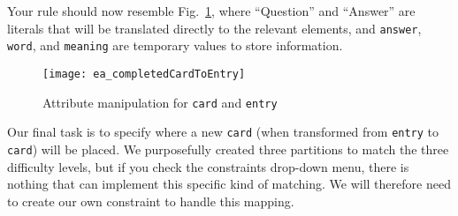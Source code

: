 Your rule should now resemble Fig.~\ref{fig:cardtoentry_2}, where ``Question'' and ``Answer'' are literals that will be translated directly to the relevant
elements, and \texttt{answer}, \texttt{word}, and \texttt{meaning} are temporary values to store information.

\vspace{0.5cm}

\begin{figure}[htbp]
\begin{center}
  \texttt{[image: ea\_completedCardToEntry]}
  \caption{Attribute manipulation for \texttt{card} and \texttt{entry}}
  \label{fig:cardtoentry_2}
\end{center}
\end{figure}
\FloatBarrier


Our final task is to specify where a new \texttt{card} (when transformed from \texttt{entry} to \texttt{card}) will be placed.  We purposefully created three
partitions to match the three difficulty levels, but if you check the constraints drop-down menu, there is nothing that can implement this specific kind of
matching. We will therefore need to create our own constraint to handle this mapping.


